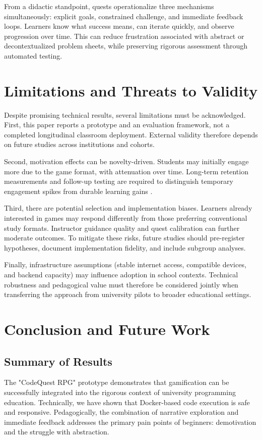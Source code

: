 \documentclass[a4paper, UKenglish, cleveref, autoref, thm-restate]{oasics-v2021}
\begin{document}
From a didactic standpoint, quests operationalize three mechanisms simultaneously: explicit goals, constrained challenge, and immediate feedback loops. Learners know what success means, can iterate quickly, and observe progression over time. This can reduce frustration associated with abstract or decontextualized problem sheets, while preserving rigorous assessment through automated testing.

\section{Limitations and Threats to Validity}
Despite promising technical results, several limitations must be acknowledged. First, this paper reports a prototype and an evaluation framework, not a completed longitudinal classroom deployment. External validity therefore depends on future studies across institutions and cohorts.

Second, motivation effects can be novelty-driven. Students may initially engage more due to the game format, with attenuation over time. Long-term retention measurements and follow-up testing are required to distinguish temporary engagement spikes from durable learning gains \cite{buckley2016motivation,cuervocely2022motivation}.

Third, there are potential selection and implementation biases. Learners already interested in games may respond differently from those preferring conventional study formats. Instructor guidance quality and quest calibration can further moderate outcomes. To mitigate these risks, future studies should pre-register hypotheses, document implementation fidelity, and include subgroup analyses.

Finally, infrastructure assumptions (stable internet access, compatible devices, and backend capacity) may influence adoption in school contexts. Technical robustness and pedagogical value must therefore be considered jointly when transferring the approach from university pilots to broader educational settings.

\section{Conclusion and Future Work}
\subsection{Summary of Results}
The "CodeQuest RPG" prototype demonstrates that gamification can be successfully integrated into the rigorous context of university programming education. Technically, we have shown that Docker-based code execution is safe and responsive. Pedagogically, the combination of narrative exploration and immediate feedback addresses the primary pain points of beginners: demotivation and the struggle with abstraction.
\end{document}
